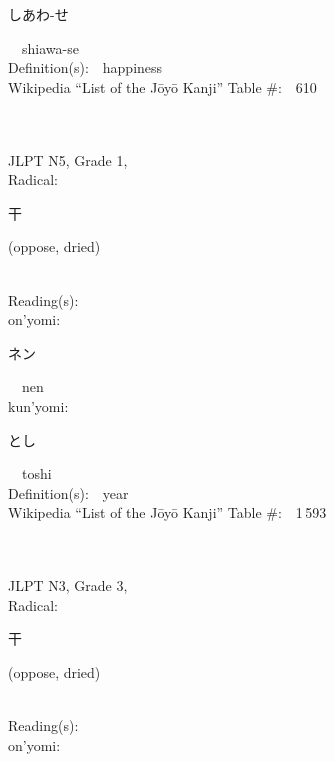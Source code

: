 \begin{multicols}{2}
{\hspace*{2em}}{\begin{CJK}{UTF8}{min} しあわ-せ \end{CJK}}\ \ shiawa-se\ \ \\
Definition(s):\ \ happiness \\
Wikipedia ``List of the J\=oy\=o Kanji'' Table \#:\ \ 610 \\
\ \ \\
{\fontsize{34pt}{40pt}  }\ \ \\  %
{JLPT N5, Grade 1, \\Radical:\ \ {\begin{CJK}{UTF8}{min} 干 \end{CJK}} (oppose, dried) } \\
Reading(s):\ \ \\
{\hspace*{1em}}on'yomi:\ \ \\
{\hspace*{2em}}{\begin{CJK}{UTF8}{min} ネン \end{CJK}}\ \ nen\ \ \\
{\hspace*{1em}}kun'yomi:\ \ \\
{\hspace*{2em}}{\begin{CJK}{UTF8}{min} とし \end{CJK}}\ \ toshi\ \ \\
Definition(s):\ \ year \\
Wikipedia ``List of the J\=oy\=o Kanji'' Table \#:\ \ 1\,593 \\
\ \ \\
{\fontsize{34pt}{40pt}  }\ \ \\  %
{JLPT N3, Grade 3, \\Radical:\ \ {\begin{CJK}{UTF8}{min} 干 \end{CJK}} (oppose, dried) } \\
Reading(s):\ \ \\
{\hspace*{1em}}on'yomi:\ \ \\

\end{multicols}
